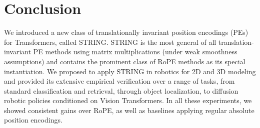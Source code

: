 \section{Conclusion}
\label{sec:conclusion}

We introduced a new class of translationally invariant position encodings (PEs) for Transformers, called STRING. STRING is the most general of all translation-invariant PE methods using matrix multiplications (under weak smoothness assumptions) and contains the prominent class of RoPE methods as its special instantiation. We proposed to apply STRING in robotics for 2D and 3D modeling and provided its extensive empirical verification over a range of tasks, from standard classification and retrieval, through object localization, to diffusion robotic policies conditioned on Vision Transformers. In all these experiments, we showed consistent gains over RoPE, as well as baselines applying regular absolute position encodings.
